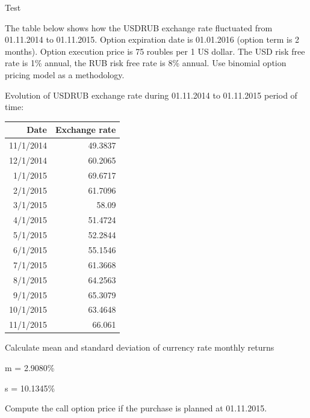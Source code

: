 \documentclass[12pt, table]{exam}
\begin{document}
\setcounter{section}{0\relax}%
\noindent
\normalsize

\begin{questions}
	\question[40] Test
	\answerstotestShort
	
	\question[20] The table below shows how the USDRUB exchange rate fluctuated from 01.11.2014 to 01.11.2015. Option expiration date is 01.01.2016 (option term is 2 months). Option execution price is 75 roubles per 1 US dollar. The USD risk free rate is 1\% annual, the RUB risk free rate is 8\% annual. Use binomial option pricing model as a methodology. 
	
	Evolution of USDRUB exchange rate during 01.11.2014 to 01.11.2015 period of time:
	\begin{table}[htbp]
		\centering
		\begin{tabular}{rr}
			\toprule
			Date & Exchange rate \\ \midrule
			11/1/2014 &       49.3837 \\
			12/1/2014 &       60.2065 \\
			1/1/2015 &       69.6717 \\
			2/1/2015 &       61.7096 \\
			3/1/2015 &         58.09 \\
			4/1/2015 &       51.4724 \\
			5/1/2015 &       52.2844 \\
			6/1/2015 &       55.1546 \\
			7/1/2015 &       61.3668 \\
			8/1/2015 &       64.2563 \\
			9/1/2015 &       65.3079 \\
			10/1/2015 &       63.4648 \\
			11/1/2015 &        66.061
		\end{tabular}%
	\end{table}
	
	
	\begin{subparts}
		\subpart[5] Calculate mean and standard deviation of currency rate monthly returns
		\begin{solution}[8em]
			
			m = 2.9080\%
			
			s = 10.1345\%	
		\end{solution}
		
		\subpart[10] Compute the call option price if the purchase is planned at 01.11.2015.
		\begin{solution}[20em]
			

\end{solution}
\end{subparts}
\end{questions}
\end{document}
